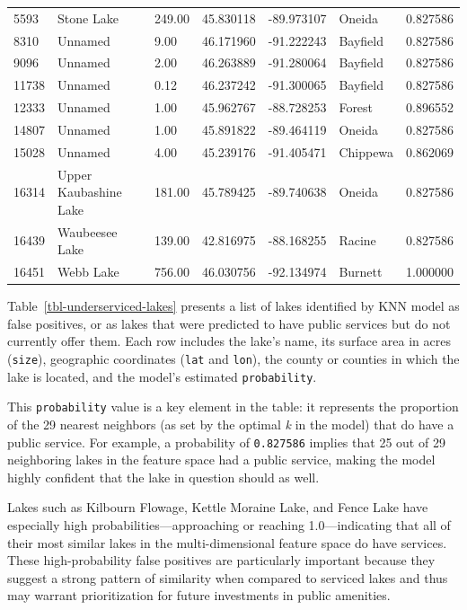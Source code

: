 \documentclass[
]{article}
\begin{document}
\begin{longtable}[]{@{}lllllll@{}}
5593 & Stone Lake & 249.00 & 45.830118 & -89.973107 & Oneida &
0.827586 \\
8310 & Unnamed & 9.00 & 46.171960 & -91.222243 & Bayfield & 0.827586 \\
9096 & Unnamed & 2.00 & 46.263889 & -91.280064 & Bayfield & 0.827586 \\
11738 & Unnamed & 0.12 & 46.237242 & -91.300065 & Bayfield & 0.827586 \\
12333 & Unnamed & 1.00 & 45.962767 & -88.728253 & Forest & 0.896552 \\
14807 & Unnamed & 1.00 & 45.891822 & -89.464119 & Oneida & 0.827586 \\
15028 & Unnamed & 4.00 & 45.239176 & -91.405471 & Chippewa & 0.862069 \\
16314 & Upper Kaubashine Lake & 181.00 & 45.789425 & -89.740638 & Oneida
& 0.827586 \\
16439 & Waubeesee Lake & 139.00 & 42.816975 & -88.168255 & Racine &
0.827586 \\
16451 & Webb Lake & 756.00 & 46.030756 & -92.134974 & Burnett &
1.000000 \\

\end{longtable}

Table~\ref{tbl-underserviced-lakes} presents a list of lakes identified
by KNN model as false positives, or as lakes that were predicted to have
public services but do not currently offer them. Each row includes the
lake's name, its surface area in acres (\texttt{size}), geographic
coordinates (\texttt{lat} and \texttt{lon}), the county or counties in
which the lake is located, and the model's estimated
\texttt{probability}.

This \texttt{probability} value is a key element in the table: it
represents the proportion of the 29 nearest neighbors (as set by the
optimal \emph{k} in the model) that do have a public service. For
example, a probability of \texttt{0.827586} implies that 25 out of 29
neighboring lakes in the feature space had a public service, making the
model highly confident that the lake in question should as well.

Lakes such as Kilbourn Flowage, Kettle Moraine Lake, and Fence Lake have
especially high probabilities---approaching or reaching 1.0---indicating
that all of their most similar lakes in the multi-dimensional feature
space do have services. These high-probability false positives are
particularly important because they suggest a strong pattern of
similarity when compared to serviced lakes and thus may warrant
prioritization for future investments in public amenities.
\end{document}
